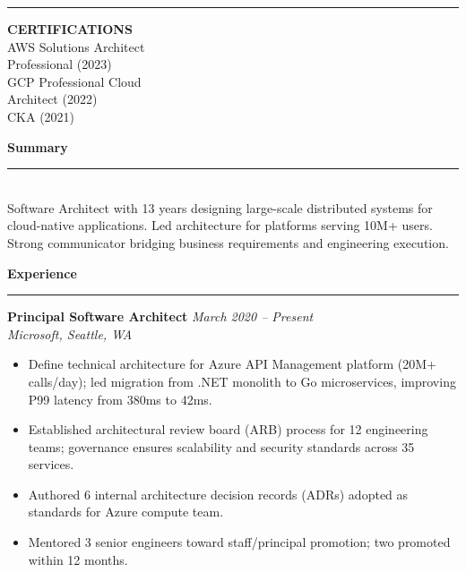 \documentclass[11pt,a4paper]{article}
\begin{document}
{\begin{minipage}[t][0.975\textheight]{0.31\textwidth}
\begin{minipage}[t]{0.88\linewidth}
  \vspace{6pt}
  \noindent\textcolor{accent}{\rule{\linewidth}{0.5pt}}

  \vspace{4pt}
  \noindent\textbf{\small\color{white}CERTIFICATIONS}\\[2pt]
  \small
  AWS Solutions Architect\\
  Professional (2023)\\[2pt]
  GCP Professional Cloud\\
  Architect (2022)\\[2pt]
  CKA (2021)

  \end{minipage}
  \end{minipage}%
}%
\hspace{6pt}
\begin{minipage}[t]{0.65\textwidth}
\vspace{8pt}

{\large\textbf{Summary}}\\
\rule{\linewidth}{0.4pt}\\[2pt]
\small
Software Architect with 13 years designing large-scale distributed systems for cloud-native applications. Led architecture for platforms serving 10M+ users. Strong communicator bridging business requirements and engineering execution.

\vspace{6pt}
{\large\textbf{Experience}}\\
\rule{\linewidth}{0.4pt}

\noindent\textbf{Principal Software Architect} \hfill \textit{March 2020 -- Present}\\
\textit{Microsoft, Seattle, WA}
\small\begin{itemize}
  \item Define technical architecture for Azure API Management platform (20M+ calls/day); led migration from .NET monolith to Go microservices, improving P99 latency from 380ms to 42ms.
  \item Established architectural review board (ARB) process for 12 engineering teams; governance ensures scalability and security standards across 35 services.
  \item Authored 6 internal architecture decision records (ADRs) adopted as standards for Azure compute team.
  \item Mentored 3 senior engineers toward staff/principal promotion; two promoted within 12 months.
\end{itemize}


\end{minipage}
\end{document}
